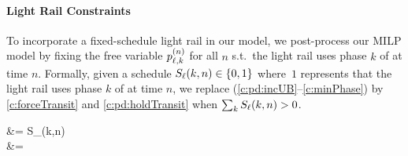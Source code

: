 \paragraph{Light Rail Constraints}
%
To incorporate a fixed-schedule light rail in our model, we post-process our
MILP model by fixing the free variable $\p[n]{\tl}{k}$ for all $n$ s.t.\ the
light rail uses phase $k$ of \tl at time $n$.
%
Formally, given a schedule $S_{\tl}(k,n) \in \{0,1\}$ where~$1$ represents that
the light rail uses phase $k$ of \tl at time $n$, we replace
(\ref{c:pd:incUB}--\ref{c:minPhase}) by \eqref{c:forceTransit} and
\eqref{c:pd:holdTransit} when $\sum_{k} S_{\tl}(k,n) > 0$.
%
\begin{cAlign}
%
 &= S_{\ell}(k,n)\\
%
 &= 
%
\end{cAlign}


